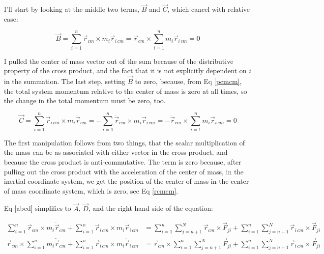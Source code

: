 \documentclass[10pt]{article}
\begin{document}
I'll start by looking at the middle two terms, $\vec{B}$ and $\vec{C}$, 
which cancel with relative ease:

\begin{equation*}
    \vec{B} = \sum_{i=1}^n \vec{r}_{cm}\times m_i\ddot{\vec{r}}_{i\,cm} = 
        \vec{r}_{cm}\times\sum_{i=1}^n m_i\ddot{\vec{r}}_{i\,cm} = 0
\end{equation*}

I pulled the center of mass vector out of the sum because of the 
distributive property of the cross product, and the fact that it is not
explicitly dependent on $i$ in the summation. The last step, setting 
$\vec{B}$ to zero, because, from Eq \ref{pcmcm}, the total system momentum 
relative to the center of mass is zero at all times, so the change 
in the total momentum must be zero, too.

\begin{equation*}
    \vec{C} = \sum_{i=1}^n \vec{r}_{i\,cm}\times m_i\ddot{\vec{r}}_{cm} = 
        - \sum_{i=1}^n \ddot{\vec{r}}_{cm}\times m_i\vec{r}_{i\,cm} =
       - \ddot{\vec{r}}_{cm}\times\sum_{i=1}^n m_i\vec{r}_{i\,cm} = 0
\end{equation*}

The first manipulation follows from two things, that the scalar 
multiplication of the mass can be as associated with either vector in the 
cross product, and because the cross product is anti-commutative. The 
term is zero because, after pulling out the cross product with the 
acceleration of the center of mass, in the inertial coordinate system, we 
get the position of the
center of mass in the center of mass coordinate system, which 
is zero, see Eq \ref{rcmcm}.

Eq \ref{abcd} simplifies to $\vec{A}$, $\vec{D}$, and the right hand side of 
the equation:

\begin{align*}
    \sum_{i=1}^n\vec{r}_{cm}\times m_i\ddot{\vec{r}}_{cm}
        +\sum_{i=1}^n\vec{r}_{i\,cm}\times m_i\ddot{\vec{r}}_{i\,cm} &= 
        \sum_{i=1}^n\sum_{j=n+1}^N\vec{r}_{cm}\times \vec{F}_{ji}+
        \sum_{i=1}^n\sum_{j=n+1}^N\vec{r}_{i\,cm}\times\vec{F}_{ji} \\
    \vec{r}_{cm} \times \sum_{i=1}^n m_i\ddot{\vec{r}}_{cm}
        +\sum_{i=1}^n\vec{r}_{i\,cm}\times m_i\ddot{\vec{r}}_{i\,cm} &= 
        \vec{r}_{cm}\times \sum_{i=1}^n\sum_{j=n+1}^N \vec{F}_{ji}+
        \sum_{i=1}^n\sum_{j=n+1}^N\vec{r}_{i\,cm}\times\vec{F}_{ji} \\
\end{align*}
\end{document}
